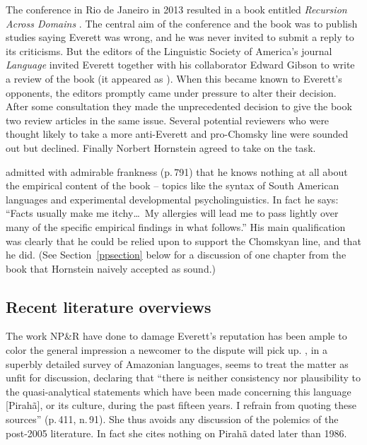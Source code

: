 \documentclass[output=paper,colorlinks,citecolor=brown
]{langscibook}
\begin{document}
The conference in Rio de Janeiro in 2013 resulted in a book entitled
\textit{Recursion Across Domains} \citep{AmMaNeRo18}. The central aim
of the conference and the book was to publish studies saying Everett
was wrong, and he was never invited to submit a reply to its
criticisms. But the editors of the Linguistic Society of America's
journal \textit{Language} invited Everett together with his
collaborator Edward Gibson to write a review of the book (it appeared
as \citealt{EverGibs19}). When this became known to Everett's
opponents, the editors promptly came under pressure to alter their
decision. After some consultation they made the unprecedented decision
to give the book two review articles in the same issue. Several
potential reviewers who were thought likely to take a more anti-Everett
and pro-Chomsky line were sounded out but declined. Finally Norbert
Hornstein agreed to take on the task.

\citet{Hornstein19} admitted with admirable frankness
(p.\,791) that he knows nothing at all about the empirical content
of the book -- topics like the syntax of South American languages
and experimental developmental psycholinguistics. In fact he says:
``Facts usually make me itchy\ldots\ My allergies will lead me to pass
lightly over many of the specific empirical findings in what follows.''
His main qualification was clearly that he could be relied upon to
support the Chomskyan line, and that he did. (See Section~\ref{ppsection}
below for a discussion of one chapter from the book that Hornstein
naively accepted as sound.)

\subsection{Recent literature overviews}

The work NP\&R have done to damage Everett's reputation has been ample
to color the general impression a newcomer to the dispute will pick up.
\citet{Aikhenvald12}, in a superbly detailed survey of Amazonian
languages, seems to treat the matter as unfit for discussion,
declaring that ``there is neither consistency nor plausibility to the
quasi-analytical statements which have been made concerning this
language [Pirah{\~a}], or its culture, during the past fifteen years.
I refrain from quoting these sources'' (p.\,411, n.\,91). She thus
avoids any discussion of the polemics of the post-2005 literature.
In fact she cites nothing on Pirah{\~a} dated later than 1986.
\end{document}
